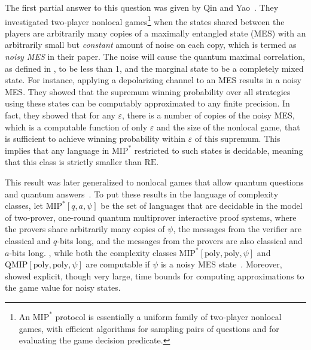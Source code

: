 \documentclass[10pt,a4paper]{article}
\theoremstyle{plain}
\theoremstyle{definition}
\newcommand {\Br} [1] {\ensuremath{ \left[ #1 \right] }}
\newcommand{\1}{\mathbb{1}} %
\newcommand{\MIP}{\mathrm{MIP}}
\newcommand{\RE}{\mathrm{RE}}
\begin{document}
The first partial answer to this question was given by Qin and Yao~\cite{qin2021nonlocal}. They investigated two-player nonlocal games\footnote{An $\MIP^*$ protocol is essentially a uniform family of two-player nonlocal games, with efficient algorithms for sampling pairs of questions and for evaluating the game decision predicate.} when the states shared between the players are arbitrarily many copies of a maximally entangled state (MES) with an arbitrarily small but \emph{constant} amount of noise on each copy, which is termed as {\em noisy MES} in their paper. 
The noise will cause the quantum maximal correlation, as defined in , to be less than 1, and the marginal state to be a completely mixed state. For instance, applying a depolarizing channel to an MES results in a noisy MES.
They showed that the supremum winning probability over all strategies using these states can be computably approximated to any finite precision. In fact, they showed that for any $\varepsilon$, there is a number of copies of the noisy MES, which is a computable function of only $\varepsilon$ and the size of the nonlocal game, that is sufficient to achieve winning probability within $\varepsilon$ of this supremum. This implies that any language in $\MIP^*$ restricted to such states is decidable, meaning that this class is strictly smaller than $\RE$.




This result was later generalized to nonlocal games that allow quantum questions and quantum answers~\cite{qin_et_al:LIPIcs.ICALP.2023.97}. 
To put these results in the language of complexity classes, let $\mathrm{MIP}^*\Br{q,a,\psi}$ be the set of languages that are decidable in the model of two-prover, one-round quantum multiprover interactive proof systems, where the provers share arbitrarily many copies of $\psi$, the messages from the verifier are classical and $q$-bits long, and the messages from the provers are also classical and $a$-bits long. 
\cite{Reichardt2013,JNVWYuen'20,JNVWY'20}, while both the complexity classes $\mathrm{MIP}^*\Br{\mathrm{poly},\mathrm{poly},\psi}$ and $\mathrm{QMIP}\Br{\mathrm{poly},\mathrm{poly},\psi}$ are computable if $\psi$ is a noisy MES state~\cite{qin2021nonlocal,qin_et_al:LIPIcs.ICALP.2023.97}. Moreover, \cite{qin2021nonlocal,qin_et_al:LIPIcs.ICALP.2023.97} showed explicit, though very large, time bounds for computing approximations to the game value for noisy states.  
\end{document}
